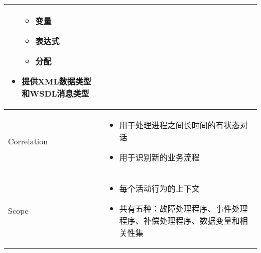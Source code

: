 \begin{longtable}{|m{3.7cm}<{\centering}|m{11cm}|}
\begin{itemize}[leftmargin=1.5em,itemsep=-2pt]
\begin{multicols}{3}
\begin{itemize}
            \item 变量
            \item 表达式
            \item 分配
        \end{itemize}
        \end{multicols}
        \vspace{-1.2em}
        \item 提供XML数据类型和WSDL消息类型
    \vspace{-1.5em}
    \end{itemize}                                           
    \\ \hline
    Correlation &
    \vspace{-1.3em}
    \begin{itemize}[leftmargin=1.5em,itemsep=-2pt]
        \item 用于处理进程之间长时间的有状态对话
        \item 用于识别新的业务流程
    \vspace{-1.5em}
    \end{itemize}                                           
    \\ \hline
    Scope &
    \vspace{-1.3em}
    \begin{itemize}[leftmargin=1.5em,itemsep=-2pt]
        \item 每个活动行为的上下文
        \item 共有五种：故障处理程序、事件处理程序、补偿处理程序、数据变量和相关性集
    \vspace{-1.5em}
    \end{itemize}                                           
    \\ \hline
\end{longtable}